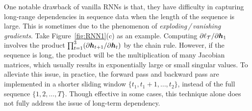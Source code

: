 One notable drawback of vanilla RNNs is that, they have difficulty in capturing long-range dependencies in sequence data when the length of the sequence is large. This is sometimes due to the phenomenon of \emph{exploding$\,$/$\,$vanishing gradients}. Take Figure~\ref{fig:RNN1}(c) as an example. Computing $\partial \ell_{\mathcal{T}} / \partial \text{\boldmath $h$}_1$ involves the product $\prod_{t=1}^3 (\partial \text{\boldmath $h$}_{t+1} / \partial \text{\boldmath $h$}_{t})$ by the chain rule. However, if the sequence is long, the product will be the multiplication of many Jacobian matrices, which usually results in exponentially large or small singular values. To alleviate this issue, in practice, the forward pass and backward pass are implemented in a shorter sliding window $\{t_1, t_1+1, \ldots,t_2\}$, instead of the full sequence $\{1,2,\ldots, T\}$. Though effective in some cases, this technique alone does not fully address the issue of long-term dependency. 

